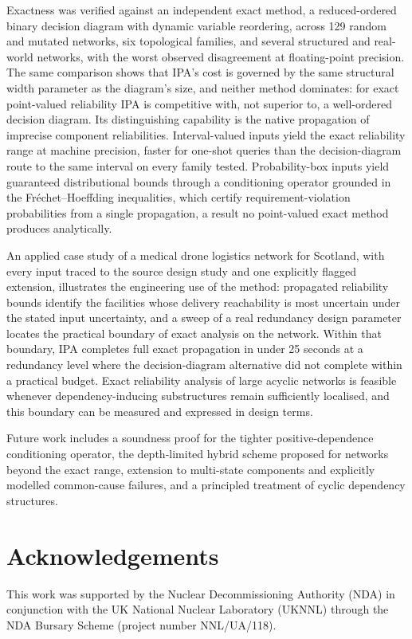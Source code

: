 \documentclass[preprint,12pt]{elsarticle}
\begin{document}
Exactness was verified against an independent exact method, a reduced-ordered binary decision diagram with dynamic variable reordering, across 129 random and mutated networks, six topological families, and several structured and real-world networks, with the worst observed disagreement at floating-point precision. The same comparison shows that IPA's cost is governed by the same structural width parameter as the diagram's size, and neither method dominates: for exact point-valued reliability IPA is competitive with, not superior to, a well-ordered decision diagram. Its distinguishing capability is the native propagation of imprecise component reliabilities. Interval-valued inputs yield the exact reliability range at machine precision, faster for one-shot queries than the decision-diagram route to the same interval on every family tested. Probability-box inputs yield guaranteed distributional bounds through a conditioning operator grounded in the Fr\'echet--Hoeffding inequalities, which certify requirement-violation probabilities from a single propagation, a result no point-valued exact method produces analytically.

An applied case study of a medical drone logistics network for Scotland, with every input traced to the source design study and one explicitly flagged extension, illustrates the engineering use of the method: propagated reliability bounds identify the facilities whose delivery reachability is most uncertain under the stated input uncertainty, and a sweep of a real redundancy design parameter locates the practical boundary of exact analysis on the network. Within that boundary, IPA completes full exact propagation in under 25 seconds at a redundancy level where the decision-diagram alternative did not complete within a practical budget. Exact reliability analysis of large acyclic networks is feasible whenever dependency-inducing substructures remain sufficiently localised, and this boundary can be measured and expressed in design terms.

Future work includes a soundness proof for the tighter positive-dependence conditioning operator, the depth-limited hybrid scheme proposed for networks beyond the exact range, extension to multi-state components and explicitly modelled common-cause failures, and a principled treatment of cyclic dependency structures.




\section*{Acknowledgements}
This work was supported by the Nuclear Decommissioning Authority (NDA) in conjunction with the UK National Nuclear Laboratory (UKNNL) through the NDA Bursary Scheme (project number NNL/UA/118).
\end{document}
